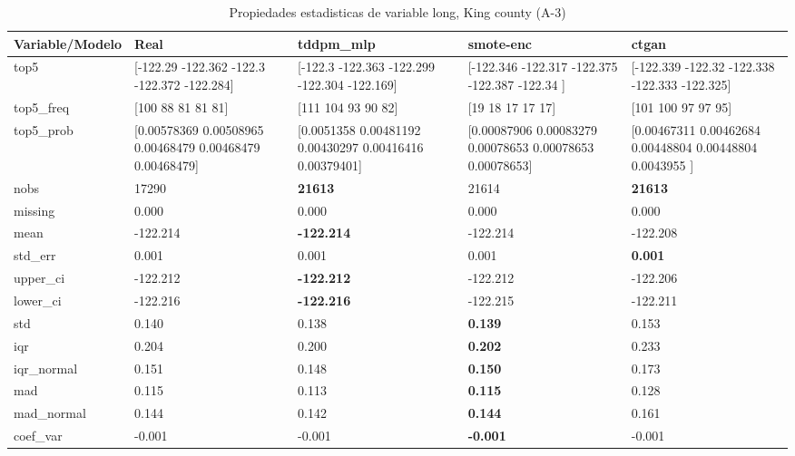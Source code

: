 \begin{table}[H]
\centering
\fontsize{8}{14}\selectfont
\caption{Propiedades  estadisticas de variable long, King county (A-3)}
\label{table-stats-king county-a-3-long}
\begin{tabular}{|l|m{10em}|m{10em}|m{10em}|m{10em}|}
\hline
 \rowcolor[gray]{0.8}
Variable/Modelo & Real & tddpm\_mlp & smote-enc & ctgan \\
\hline top5 & [-122.29  -122.362 -122.3   -122.372 -122.284] & [-122.3   -122.363 -122.299 -122.304 -122.169] & [-122.346 -122.317 -122.375 -122.387 -122.34 ] & [-122.339 -122.32  -122.338 -122.333 -122.325] \\
\hline top5\_freq & [100  88  81  81  81] & [111 104  93  90  82] & [19 18 17 17 17] & [101 100  97  97  95] \\
\hline top5\_prob & [0.00578369 0.00508965 0.00468479 0.00468479 0.00468479] & [0.0051358  0.00481192 0.00430297 0.00416416 0.00379401] & [0.00087906 0.00083279 0.00078653 0.00078653 0.00078653] & [0.00467311 0.00462684 0.00448804 0.00448804 0.0043955 ] \\
\hline nobs & 17290 & \bfseries 21613 & \cellcolor[rgb]{0.9, 0.54, 0.52} 21614 & \bfseries 21613 \\
\hline missing & 0.000 & 0.000 & 0.000 & 0.000 \\
\hline mean & -122.214 & \bfseries -122.214 & -122.214 & \cellcolor[rgb]{0.9, 0.54, 0.52} -122.208 \\
\hline std\_err & 0.001 & \cellcolor[rgb]{0.9, 0.54, 0.52} 0.001 & 0.001 & \bfseries 0.001 \\
\hline upper\_ci & -122.212 & \bfseries -122.212 & -122.212 & \cellcolor[rgb]{0.9, 0.54, 0.52} -122.206 \\
\hline lower\_ci & -122.216 & \bfseries -122.216 & -122.215 & \cellcolor[rgb]{0.9, 0.54, 0.52} -122.211 \\
\hline std & 0.140 & 0.138 & \bfseries 0.139 & \cellcolor[rgb]{0.9, 0.54, 0.52} 0.153 \\
\hline iqr & 0.204 & 0.200 & \bfseries 0.202 & \cellcolor[rgb]{0.9, 0.54, 0.52} 0.233 \\
\hline iqr\_normal & 0.151 & 0.148 & \bfseries 0.150 & \cellcolor[rgb]{0.9, 0.54, 0.52} 0.173 \\
\hline mad & 0.115 & 0.113 & \bfseries 0.115 & \cellcolor[rgb]{0.9, 0.54, 0.52} 0.128 \\
\hline mad\_normal & 0.144 & 0.142 & \bfseries 0.144 & \cellcolor[rgb]{0.9, 0.54, 0.52} 0.161 \\
\hline coef\_var & -0.001 & -0.001 & \bfseries -0.001 & \cellcolor[rgb]{0.9, 0.54, 0.52} -0.001 \\

\end{tabular}
\end{table}
